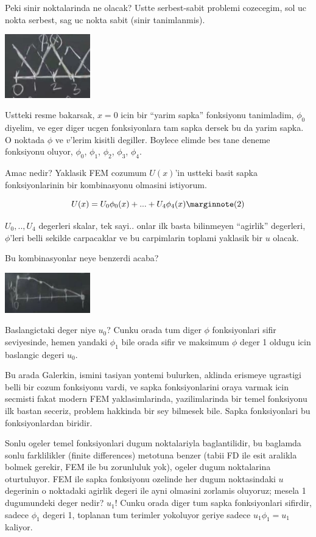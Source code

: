 \documentclass[12pt,fleqn]{article}\usepackage{../../common}
\begin{document}
Peki sinir noktalarinda ne olacak? Ustte serbest-sabit problemi cozecegim,
sol uc nokta serbest, sag uc nokta sabit (sinir tanimlanmis). 

\includegraphics[width=10em]{compscieng_1_18_02.png}

Ustteki resme bakarsak, $x=0$ icin bir ``yarim sapka'' fonksiyonu tanimladim,
$\phi_0$ diyelim, ve eger diger ucgen fonksiyonlara tam sapka dersek bu da yarim
sapka. O noktada $\phi$ ve $v$'lerim kisitli degiller. Boylece elimde bes tane
deneme fonksiyonu oluyor, $\phi_0$, $\phi_1$, $\phi_2$, $\phi_3$, $\phi_4$.

Amac nedir? Yaklasik FEM cozumum $U(x)$'in ustteki basit sapka fonksiyonlarinin
bir kombinasyonu olmasini istiyorum.

$$
U(x) = U_0 \phi_0(x) + ... + U_4 \phi_4(x)
\mlabel{2}
$$

$U_0,..,U_4$ degerleri skalar, tek sayi.. onlar ilk basta bilinmeyen ``agirlik''
degerleri, $\phi$'leri belli sekilde carpacaklar ve bu carpimlarin toplami
yaklasik bir $u$ olacak.

Bu kombinasyonlar neye benzerdi acaba? 

\includegraphics[width=10em]{compscieng_1_18_03.png}

Baslangictaki deger niye $u_0$? Cunku orada tum diger $\phi$ fonksiyonlari sifir
seviyesinde, hemen yandaki $\phi_1$ bile orada sifir ve maksimum $\phi$ deger 1
oldugu icin baslangic degeri $u_0$.

Bu arada Galerkin, ismini tasiyan yontemi bulurken, aklinda erismeye ugrastigi
belli bir cozum fonksiyonu vardi, ve sapka fonksiyonlarini oraya varmak icin
secmisti fakat modern FEM yaklasimlarinda, yazilimlarinda bir temel fonksiyonu
ilk bastan seceriz, problem hakkinda bir sey bilmesek bile. Sapka fonksiyonlari
bu fonksiyonlardan biridir.

Sonlu ogeler temel fonksiyonlari dugum noktalariyla baglantilidir, bu baglamda
sonlu farklilikler (finite differences) metotuna benzer (tabii FD ile esit
aralikla bolmek gerekir, FEM ile bu zorunluluk yok), ogeler dugum noktalarina
oturtuluyor. FEM ile sapka fonksiyonu ozelinde her dugum noktasindaki $u$
degerinin o noktadaki agirlik degeri ile ayni olmasini zorlamis oluyoruz; mesela
1 dugumundeki deger nedir? $u_1$! Cunku orada diger tum sapka fonksiyonlari
sifirdir, sadece $\phi_1$ degeri 1, toplanan tum terimler yokoluyor geriye
sadece $u_1 \phi_1 = u_1$ kaliyor.
\end{document}
